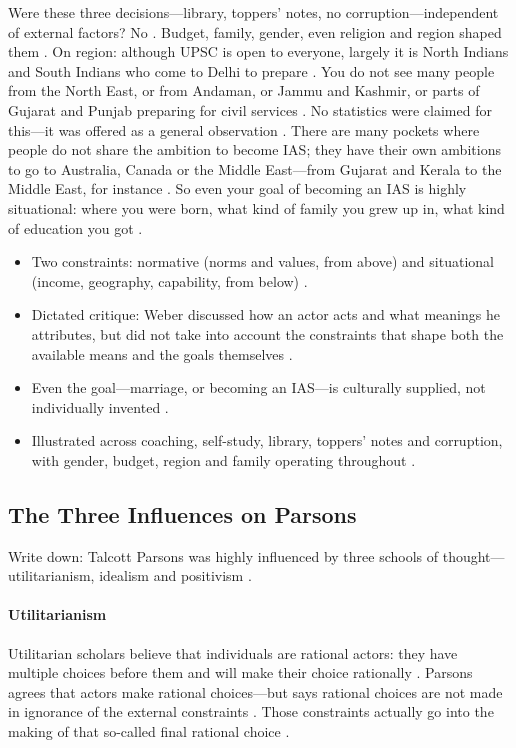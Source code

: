 \begin{CriticalPoint}
Were these three decisions---library, toppers' notes, no corruption---independent of external factors? No . Budget, family, gender, even religion and region shaped them .
On region: although UPSC is open to everyone, largely it is North Indians and South Indians who come to Delhi to prepare . You do not see many people from the North East, or from Andaman, or Jammu and Kashmir, or parts of Gujarat and Punjab preparing for civil services . No statistics were claimed for this---it was offered as a general observation .
There are many pockets where people do not share the ambition to become IAS; they have their own ambitions to go to Australia, Canada or the Middle East---from Gujarat and Kerala to the Middle East, for instance .
So even your goal of becoming an IAS is highly situational: where you were born, what kind of family you grew up in, what kind of education you got .
\end{CriticalPoint}

\begin{QuickRevision}
\begin{itemize}
    \item Two constraints: normative (norms and values, from above) and situational (income, geography, capability, from below) .
    \item Dictated critique: Weber discussed how an actor acts and what meanings he attributes, but did not take into account the constraints that shape both the available means and the goals themselves .
    \item Even the goal---marriage, or becoming an IAS---is culturally supplied, not individually invented .
    \item Illustrated across coaching, self-study, library, toppers' notes and corruption, with gender, budget, region and family operating throughout .
\end{itemize}
\end{QuickRevision}

\subsection{The Three Influences on Parsons}
Write down: Talcott Parsons was highly influenced by three schools of thought---utilitarianism, idealism and positivism .

\paragraph{Utilitarianism}
Utilitarian scholars believe that individuals are rational actors: they have multiple choices before them and will make their choice rationally .
Parsons agrees that actors make rational choices---but says rational choices are not made in ignorance of the external constraints . Those constraints actually go into the making of that so-called final rational choice .

